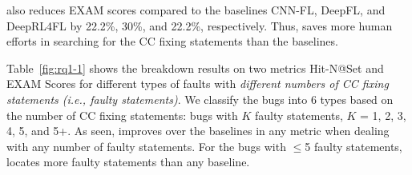 
{\tool} also reduces EXAM scores compared to the baselines CNN-FL,
DeepFL, and DeepRL4FL by 22.2\%, 30\%, and 22.2\%, respectively. Thus,
{\tool} saves more human efforts in searching for the CC fixing
statements than the baselines.



Table~\ref{fig:rq1-1} shows the breakdown results on two metrics
Hit-N@Set and EXAM Scores for different types of faults with {\em
different numbers of CC fixing statements (i.e., faulty
statements)}. We classify the bugs into 6 types based on the number of
CC fixing statements: bugs with $K$ faulty statements, $K$ = 1, 2, 3,
4, 5, and 5+. As seen, {\tool} improves over the baselines in any
metric when dealing with any number of faulty statements. For the bugs with $\leq$5 faulty statements, {\tool} locates more
faulty statements than any baseline.

